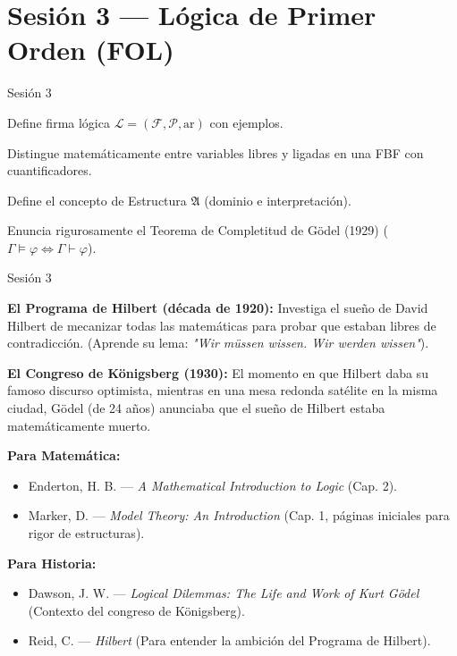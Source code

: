 \documentclass[11pt, letterpaper]{article}
\begin{document}
\newpage

\section{Sesi\'on 3 --- L\'ogica de Primer Orden (FOL)}

\begin{verificacion}{Sesi\'on 3}
\begin{checklist}
  \item Define firma l\'ogica $\mathcal{L}=(\mathcal{F},\mathcal{P},\text{ar})$ con ejemplos.
  \item Distingue matem\'aticamente entre variables libres y ligadas en una FBF con cuantificadores.
  \item Define el concepto de Estructura $\mathfrak{A}$ (dominio e interpretaci\'on).
  \item Enuncia rigurosamente el Teorema de Completitud de G\"odel (1929) ($\Gamma\models\varphi \Leftrightarrow \Gamma\vdash\varphi$).
\end{checklist}
\end{verificacion}

\begin{historia}{Sesi\'on 3}
\begin{checklist}
  \item \textbf{El Programa de Hilbert (d\'ecada de 1920):} Investiga el sue\~no de David Hilbert de mecanizar todas las matem\'aticas para probar que estaban libres de contradicci\'on. (Aprende su lema: \textit{"Wir m\"ussen wissen. Wir werden wissen"}).
  \item \textbf{El Congreso de K\"onigsberg (1930):} El momento en que Hilbert daba su famoso discurso optimista, mientras en una mesa redonda sat\'elite en la misma ciudad, G\"odel (de 24 a\~nos) anunciaba que el sue\~no de Hilbert estaba matem\'aticamente muerto.
\end{checklist}
\end{historia}

\begin{referencias}
\textbf{Para Matem\'atica:}
\begin{itemize}
    \item Enderton, H. B. --- \textit{A Mathematical Introduction to Logic} (Cap. 2).
    \item Marker, D. --- \textit{Model Theory: An Introduction} (Cap. 1, p\'aginas iniciales para rigor de estructuras).
\end{itemize}
\textbf{Para Historia:}
\begin{itemize}
    \item Dawson, J. W. --- \textit{Logical Dilemmas: The Life and Work of Kurt G\"odel} (Contexto del congreso de K\"onigsberg).
    \item Reid, C. --- \textit{Hilbert} (Para entender la ambici\'on del Programa de Hilbert).
\end{itemize}
\end{referencias}
\end{document}
